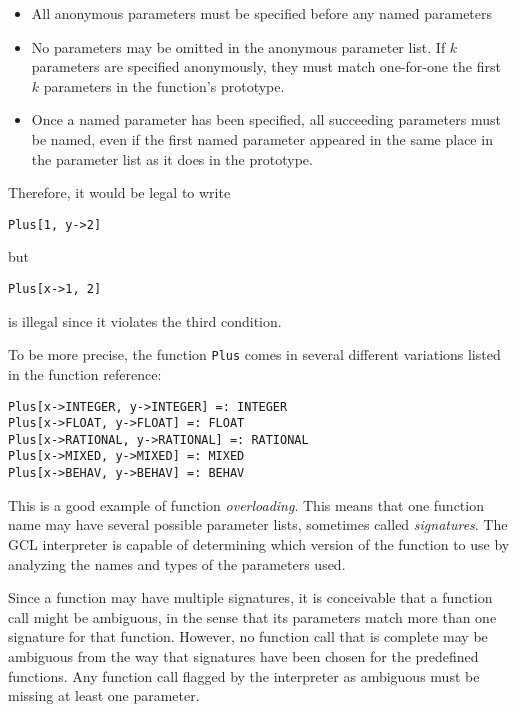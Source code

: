 \begin{itemize}
\item All anonymous parameters must be specified before any named
parameters
\item No parameters may be omitted in the anonymous parameter list.
If $k$ parameters are specified anonymously, they must match
one-for-one the first $k$ parameters in the function's prototype.
\item Once a named parameter has been specified, all succeeding
parameters must be named, even if the first named parameter appeared
in the same place in the parameter list as it does in the prototype.
\end{itemize}

\noindent Therefore, it would be legal to write

\begin{verbatim}
Plus[1, y->2]
\end{verbatim}

\noindent but

\begin{verbatim}
Plus[x->1, 2]
\end{verbatim}

\noindent is illegal since it violates the third condition.

To be more precise, the function {\tt Plus} comes in several different
variations listed in the function reference:

\begin{verbatim}
Plus[x->INTEGER, y->INTEGER] =: INTEGER
Plus[x->FLOAT, y->FLOAT] =: FLOAT
Plus[x->RATIONAL, y->RATIONAL] =: RATIONAL
Plus[x->MIXED, y->MIXED] =: MIXED
Plus[x->BEHAV, y->BEHAV] =: BEHAV
\end{verbatim}

\noindent This is a good example of function {\it overloading}.  This
means that one function name may have several possible parameter
lists, sometimes called {\it signatures}.  The GCL interpreter is
capable of determining which version of the function to use by
analyzing the names and types of the parameters used.

Since a function may have multiple signatures, it is conceivable that
a function call might be ambiguous, in the sense that its parameters
match more than one signature for that function.  However, no function
call that is complete may be ambiguous from the way that signatures
have been chosen for the predefined functions.  Any function call
flagged by the interpreter as ambiguous must be missing at least one
parameter.


